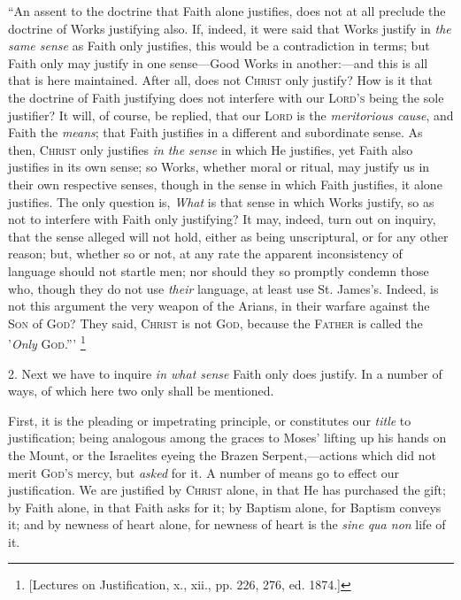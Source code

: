 ``An assent to the doctrine that Faith alone justifies, does
not at all preclude the doctrine of Works justifying also. If, indeed,
it were said that Works justify in \emph{the same sense} as Faith only
justifies, this would be a contradiction in terms; but Faith
only may justify in one sense—Good Works in another:—and this is
all that is here maintained. After all, does not C\textsc{hrist}
only justify? How is it that the doctrine of Faith justifying does not
interfere with our L\textsc{ord's} being the sole
justifier? It will, of course, be replied, that our L\textsc{ord}
is the \emph{meritorious cause}, and Faith the \emph{means}; that
Faith justifies in a different and subordinate sense. As then, C\textsc{hrist}
only justifies \emph{in the sense} in which He justifies, yet Faith
also justifies in its own sense; so Works, whether moral or ritual,
may justify us in their own respective senses, though in the sense in
which Faith justifies, it alone justifies. The only question is, \emph{What}
is that sense in which Works justify, so as not to interfere with
Faith only justifying? It may, indeed, turn out on inquiry, that the
sense alleged will not hold, either as being unscriptural, or for any
other reason; but, whether so or not, at any rate the apparent
inconsistency of language should not startle men; nor should they so
promptly condemn those who, though they do not use \emph{their}
language, at least use St. James's. Indeed, is not this argument the
very weapon of the Arians, in their warfare against the S\textsc{on}
of G\textsc{od}? They said, C\textsc{hrist}
is not G\textsc{od}, because the F\textsc{ather}
is called the '\emph{Only} G\textsc{od}.''' \footnote{[Lectures on
Justification, x., xii., pp.
226, 276, ed. 1874.]}

2. Next we have to inquire \emph{in what sense} Faith only does
justify. In a number of ways, of which here two only shall be
mentioned.

First, it is the pleading or impetrating principle, or constitutes
our \emph{title} to justification; being analogous among the graces to
Moses' lifting up his hands on the Mount, or the Israelites eyeing the
Brazen Serpent,—actions which did not merit G\textsc{od's}
mercy, but \emph{asked} for it. A number of means go to effect our
justification. We are justified by C\textsc{hrist}
alone, in that He has purchased the gift; by Faith alone, in that
Faith asks for it; by Baptism alone, for Baptism conveys it; and by
newness of heart alone, for newness of heart is the \emph{sine qua non}
life of it.

